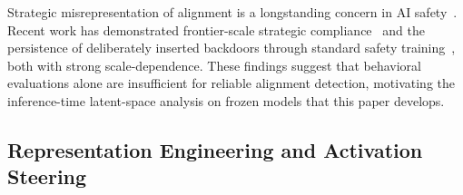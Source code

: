 \documentclass{article}
\begin{document}
Strategic misrepresentation of alignment is a longstanding concern in AI safety~\cite{hubinger2024sleeper, greenblatt2024alignment}. Recent work has demonstrated frontier-scale strategic compliance~\cite{greenblatt2024alignment} and the persistence of deliberately inserted backdoors through standard safety training~\cite{hubinger2024sleeper}, both with strong scale-dependence. These findings suggest that behavioral evaluations alone are insufficient for reliable alignment detection, motivating the inference-time latent-space analysis on frozen models that this paper develops.

\subsection{Representation Engineering and Activation Steering}
\end{document}
